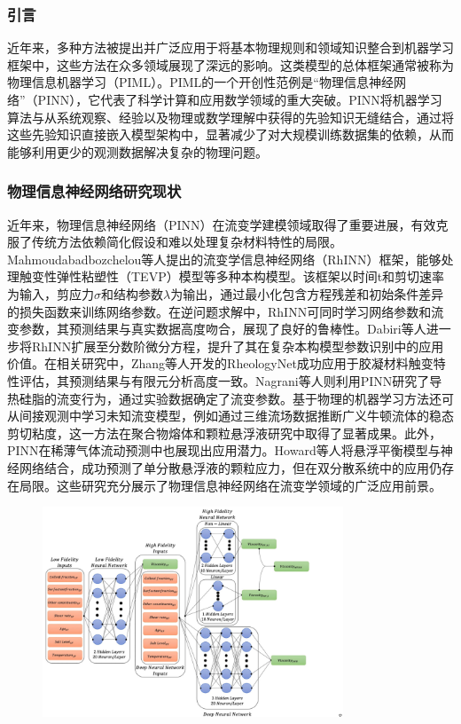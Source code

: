 \subsubsection{引言}
近年来，多种方法被提出并广泛应用于将基本物理规则和领域知识整合到机器学习框架中，这些方法在众多领域展现了深远的影响。这类模型的总体框架通常被称为物理信息机器学习（PIML）。PIML的一个开创性范例是“物理信息神经网络”（PINN），它代表了科学计算和应用数学领域的重大突破。PINN将机器学习算法与从系统观察、经验以及物理或数学理解中获得的先验知识无缝结合，通过将这些先验知识直接嵌入模型架构中，显著减少了对大规模训练数据集的依赖，从而能够利用更少的观测数据解决复杂的物理问题。

\subsubsection{物理信息神经网络研究现状}
近年来，物理信息神经网络（PINN）在流变学建模领域取得了重要进展，有效克服了传统方法依赖简化假设和难以处理复杂材料特性的局限。Mahmoudabadbozchelou等人提出的流变学信息神经网络（RhINN）框架，能够处理触变性弹性粘塑性（TEVP）模型等多种本构模型。该框架以时间t和剪切速率为输入，剪应力$\sigma$和结构参数$\lambda$为输出，通过最小化包含方程残差和初始条件差异的损失函数来训练网络参数。在逆问题求解中，RhINN可同时学习网络参数和流变参数，其预测结果与真实数据高度吻合，展现了良好的鲁棒性。Dabiri等人进一步将RhINN扩展至分数阶微分方程，提升了其在复杂本构模型参数识别中的应用价值。在相关研究中，Zhang等人开发的RheologyNet成功应用于胶凝材料触变特性评估，其预测结果与有限元分析高度一致。Nagrani等人则利用PINN研究了导热硅脂的流变行为，通过实验数据确定了流变参数。基于物理的机器学习方法还可从间接观测中学习未知流变模型，例如通过三维流场数据推断广义牛顿流体的稳态剪切粘度，这一方法在聚合物熔体和颗粒悬浮液研究中取得了显著成果。此外，PINN在稀薄气体流动预测中也展现出应用潜力。Howard等人将悬浮平衡模型与神经网络结合，成功预测了单分散悬浮液的颗粒应力，但在双分散系统中的应用仍存在局限。这些研究充分展示了物理信息神经网络在流变学领域的广泛应用前景。
\begin{figure}[htbp]
	\centering
	\includegraphics[width=0.8\textwidth]{Fig/MFNN.png}
\end{figure}

